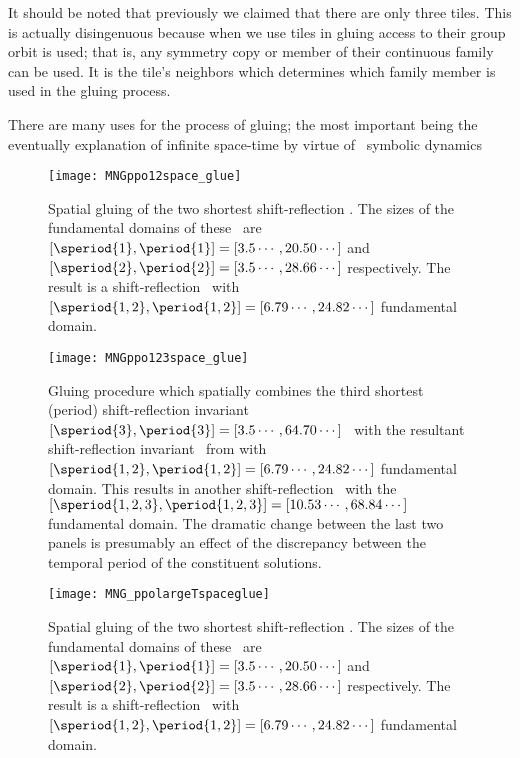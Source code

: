 

It should be noted that previously we claimed that
there are only three tiles. This is actually disingenuous because when we use tiles
in gluing access to their group orbit is used; that is, any symmetry copy or member
of their continuous family can be used. It is the tile's neighbors which
determines which family member is used in the gluing process.

There are many uses for the process of gluing; the most important being the
eventually explanation of infinite space-time by virtue of \spt\ symbolic
dynamics

\begin{figure}
\centering
\begin{minipage}[height=.4\textheight]{.66\textwidth}
\centering
\texttt{[image: MNGppo12space\_glue]}
\end{minipage}
\caption{ \label{fig:MNGppo12spaceglue}
Spatial gluing of the two shortest shift-reflection
\twots. The sizes of the fundamental domains of these
\twots\ are
$[\speriod{1},\period{1}]=[3.5\cdots,20.50\cdots]$
and
$[\speriod{2},\period{2}]=[3.5\cdots,28.66\cdots]$
respectively.
The result is a
shift-reflection \twot\ with
$[\speriod{1,2},\period{1,2}]=[6.79\cdots,24.82\cdots]$
fundamental domain.
}
\end{figure}


\begin{figure}
\begin{minipage}[height=.4\textheight]{.99\textwidth}
\centering
\texttt{[image: MNGppo123space\_glue]}
\end{minipage}
\caption{ \label{fig:ppo123spaceglue}
Gluing procedure which spatially combines the third shortest (period) shift-reflection
invariant
$[\speriod{3},\period{3}]=[3.5\cdots,64.70\cdots]$
\twot\
 with the resultant shift-reflection invariant \twot\
from
with
$[\speriod{1,2},\period{1,2}]=[6.79\cdots,24.82\cdots]$
fundamental domain.
This results in another shift-reflection
\twot\ with the
$[\speriod{1,2,3},\period{1,2,3}]=[10.53\cdots,68.84\cdots]$
 fundamental domain.
The dramatic change between the last
two panels is presumably an effect of the
discrepancy between the temporal period of
the constituent solutions.
}
\end{figure}


\begin{figure}
\centering
\begin{minipage}[height=.4\textheight]{.66\textwidth}
\centering
\texttt{[image: MNG\_ppolargeTspaceglue]}
\end{minipage}
\caption{ \label{fig:MNGppo12spaceglue1}
Spatial gluing of the two shortest shift-reflection
\twots. The sizes of the fundamental domains of these
\twots\ are
$[\speriod{1},\period{1}]=[3.5\cdots,20.50\cdots]$
and
$[\speriod{2},\period{2}]=[3.5\cdots,28.66\cdots]$
respectively.
The result is a
shift-reflection \twot\ with
$[\speriod{1,2},\period{1,2}]=[6.79\cdots,24.82\cdots]$
fundamental domain.
}
\end{figure}


